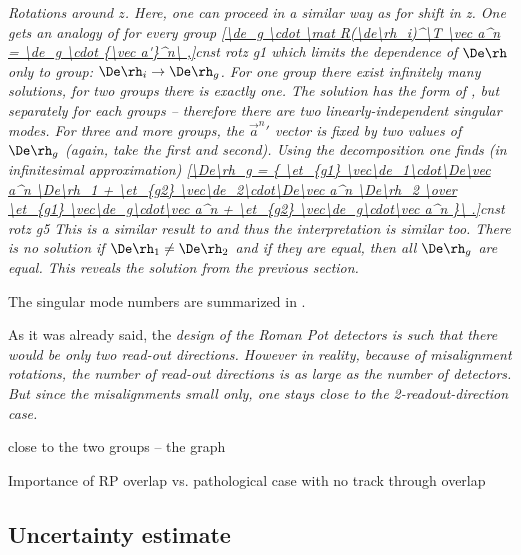 \em{Rotations around $z$}. Here, one can proceed in a similar way as for shift in z. One gets an analogy of  for every group
\eqref{\de_g \cdot \mat R(\de\rh_i)^\T \vec a^n = \de_g \cdot {\vec a'}^n\ ,}{cnst rotz g1}
 which limits the dependence of $\De\rh$ only to group: $\De\rh_i \rightarrow \De\rh_g$. For \em{one} group there exist infinitely many solutions, for \em{two groups} there is exactly one. The solution has the form of , but separately for each groups -- therefore there are two linearly-independent singular modes. For \em{three and more groups}, the ${\vec a^n}'$ vector is fixed by two values of $\De\rh_g$ (again, take the first and second). Using the decomposition  one finds (in infinitesimal approximation)
\eqref{\De\rh_g = {
\et_{g1} \vec\de_1\cdot\De\vec a^n \De\rh_1 + \et_{g2} \vec\de_2\cdot\De\vec a^n \De\rh_2
\over
\et_{g1} \vec\de_g\cdot\vec a^n + \et_{g2} \vec\de_g\cdot\vec a^n
}\ .}{cnst rotz g5}
This is a similar result to  and thus the interpretation is similar too. There is no solution if $\De\rh_1 \neq \De\rh_2$ and if they are equal, then all $\De\rh_g$ are equal. This reveals the solution  from the previous section.

The singular mode numbers are summarized in .


As it was already said, the \em{design} of the Roman Pot detectors is such that there would be only two read-out directions. However in \em{reality}, because of misalignment rotations, the number of read-out directions is as large as the number of detectors. But since the misalignments small only, one stays close to the 2-readout-direction case. 

\> close to the two groups -- the graph



\> Importance of RP overlap vs. pathological case with no track through overlap


\subsection{Uncertainty estimate}

